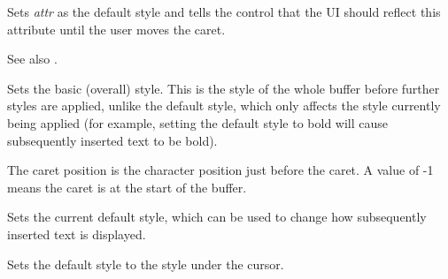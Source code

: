 \label{wxrichtextctrlsetandshowdefaultstyle}


Sets {\it attr} as the default style and tells the control that the UI should reflect
this attribute until the user moves the caret.

See also .

\label{wxrichtextctrlsetbasicstyle}



Sets the basic (overall) style. This is the style of the whole
buffer before further styles are applied, unlike the default style, which
only affects the style currently being applied (for example, setting the default
style to bold will cause subsequently inserted text to be bold).

\label{wxrichtextctrlsetcaretposition}


The caret position is the character position just before the caret.
A value of -1 means the caret is at the start of the buffer.

\label{wxrichtextctrlsetdefaultstyle}


Sets the current default style, which can be used to change how subsequently inserted
text is displayed.

\label{wxrichtextctrlsetdefaultstyletocursorstyle}


Sets the default style to the style under the cursor.

\label{wxrichtextctrlsetdelayedlayoutthreshold}


